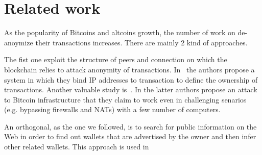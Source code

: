 \section{Related work}
As the popularity of Bitcoins and altcoins growth, the number of work on
de-anoymize their transactions increases. There are mainly 2 kind of approaches.

The fist one exploit the structure of peers and connection on which the blockchain relies to attack anonymity of transactions. In~\cite{anonBitcoin} the authors propose a system in which they bind IP addresses to transaction to define the ownership of transactions. Another valuable study is~\cite{deanonP2P}. In the latter authors propose an attack to Bitcoin infrastructure that they claim to work even in challenging senarios (e.g. bypassing firewalls and NATs) with a few number of computers.

An orthogonal, as the one we followed, is to search for public information on the Web in order to find out wallets that are advertised by the owner and then infer other related wallets. This approach is used in~\cite{fistful}